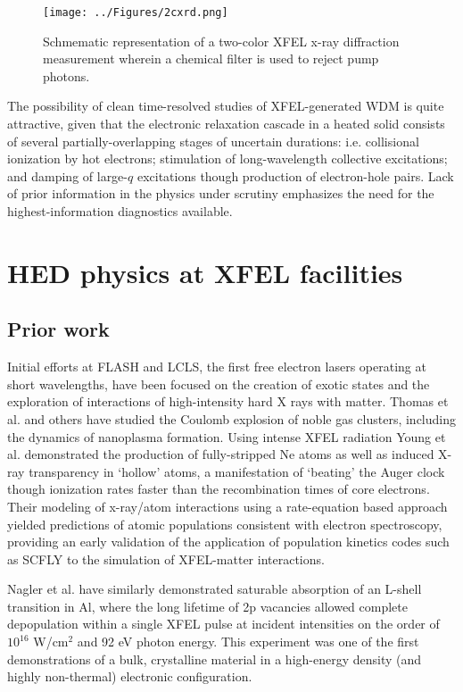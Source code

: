 \documentclass [11pt, proquest, article] {uwthesis}[2016/11/22]
\begin{document}
\begin{figure}[h] 
\caption{Schmematic representation of a two-color XFEL x-ray diffraction measurement wherein a chemical filter is used to reject pump photons.}
\label{2cxrd}
\centering
\texttt{[image: ../Figures/2cxrd.png]}
\end{figure}


The possibility of clean time-resolved studies of XFEL-generated WDM is quite attractive, given that the electronic relaxation cascade in a heated solid consists of several partially-overlapping stages of uncertain durations: i.e. collisional ionization by hot electrons; stimulation of long-wavelength collective excitations; and damping of large-$q$ excitations though production of electron-hole pairs. Lack of prior information in the physics under scrutiny emphasizes the need for the highest-information diagnostics available.

\section{HED physics at XFEL facilities}
\subsection{Prior work}
Initial efforts at FLASH and LCLS, the first free electron lasers operating at short wavelengths, have been focused on the creation of exotic states and the exploration of interactions of high-intensity hard X rays with matter. Thomas et al. and others have studied the Coulomb explosion of noble gas clusters, including the dynamics of nanoplasma formation.\cite{thomas2009shell} Using intense XFEL radiation Young et al. demonstrated the production of fully-stripped Ne atoms as well as induced X-ray transparency in `hollow' atoms, a manifestation of `beating' the Auger clock though ionization rates faster than the recombination times of core electrons. \cite{keski1974total, young2010femtosecond} Their modeling of x-ray/atom interactions using a rate-equation based approach yielded predictions of atomic populations consistent with electron spectroscopy, providing an early validation of the application of population kinetics codes such as SCFLY to the simulation of XFEL-matter interactions. \cite{chung2017atomic}


Nagler et al. have similarly demonstrated saturable absorption of an L-shell transition in Al, where the long lifetime of 2p vacancies allowed complete depopulation within a single XFEL pulse at incident intensities on the order of $10^{16}$ W/cm$^2$ and 92 eV photon energy.\cite{nagler2009turning} This experiment was one of the first demonstrations of a bulk, crystalline material in a high-energy density (and highly non-thermal) electronic configuration. 
\end{document}
